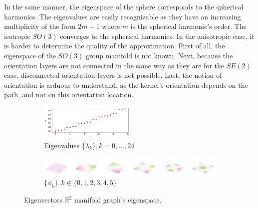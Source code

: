 \documentclass{article}
\begin{document}
In the same manner, the eigenspace of the sphere corresponds to the spherical harmonics. The eigenvalues are easily recognizable as they have an increasing multiplicity of the form $2m + 1$ where $m$ is the spherical harmonic's order. The isotropic $SO(3)$ converges to the spherical harmonics. In the anisotropic case, it is harder to determine the quality of the approximation. First of all, the eigenspace of the $SO(3)$ group manifold is not known. Next, because the orientation layers are not connected in the same way as they are for the $SE(2)$ case, disconnected orientation layers is not possible. Last, the notion of orientation is arduous to understand, as the kernel's orientation depends on the path, and not on this orientation location. 


\begin{figure}[h!] 
    \centering
    \begin{subfigure}[b]{0.9\textwidth}
        \centering
        \includegraphics[width=0.5\textwidth]{Images/r2_eigenvals.png}
        \caption{Eigenvalues $\{\lambda_k\}, k=0, \dots, 24$}
    \end{subfigure}
    \hfill
    \begin{subfigure}[b]{\textwidth}
        \centering
        \includegraphics[width=\textwidth]{Images/r2_eigenvecs.png}
        \caption{$\{\phi_k\}, k \in \{0, 1, 2, 3, 4, 5\}$}
    \end{subfigure}
    \caption{Eigenvectors $\mathbb{R}^2$ manifold graph's eigenspace.}
    \label{fig:r2_eigenspace}
\end{figure}
\end{document}
